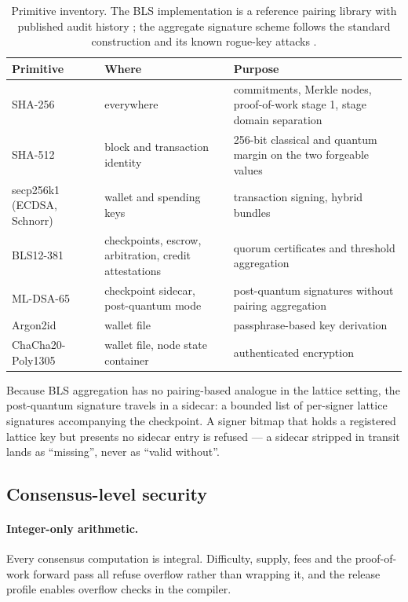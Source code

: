 \documentclass{article}
\begin{document}
\begin{table}[t]
\centering
\begin{tabular}{@{}p{}p{}p{}@{}}
\toprule
\textbf{Primitive} & \textbf{Where} & \textbf{Purpose} \\
\midrule
SHA-256 & everywhere & commitments, Merkle nodes, proof-of-work stage 1, stage
  domain separation \\
SHA-512 & block and transaction identity & 256-bit classical and quantum
  margin on the two forgeable values \\
secp256k1 (ECDSA, Schnorr) & wallet and spending keys & transaction signing,
  hybrid bundles \\
BLS12-381 & checkpoints, escrow, arbitration, credit attestations & quorum
  certificates and threshold aggregation \\
ML-DSA-65 & checkpoint sidecar, post-quantum mode & post-quantum signatures
  without pairing aggregation \\
Argon2id & wallet file & passphrase-based key derivation \\
ChaCha20-Poly1305 & wallet file, node state container & authenticated
  encryption \\
\bottomrule
\end{tabular}
\caption{Primitive inventory. The BLS implementation is a reference pairing
library with published audit history \cite{supranational-blst}; the aggregate
signature scheme follows the standard construction and its known rogue-key
attacks \cite{boneh2003aggregate,boneh2018multisignatures}.}
\label{tab:crypto}
\end{table}

Because BLS aggregation has no pairing-based analogue in the lattice setting,
the post-quantum signature travels in a sidecar: a bounded list of per-signer
lattice signatures accompanying the checkpoint. A signer bitmap that holds a
registered lattice key but presents no sidecar entry is refused --- a sidecar
stripped in transit lands as ``missing'', never as ``valid without''.

\subsection{Consensus-level security}

\paragraph{Integer-only arithmetic.} Every consensus computation is integral.
Difficulty, supply, fees and the proof-of-work forward pass all refuse
overflow rather than wrapping it, and the release profile enables overflow
checks in the compiler.
\end{document}

